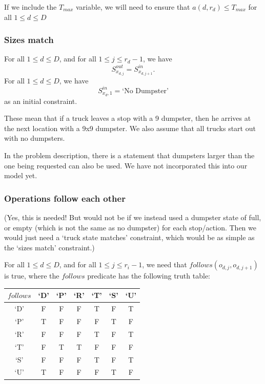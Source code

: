 \documentclass{article}
\begin{document}
If we include the $T_{max}$ variable, we will need to ensure that $a(d,r_d) \le T_{max}$ for all $1 \le d \le D$

\subsubsection {Sizes match}

For all $1 \le d \le D$, and for all $1 \le j \le r_d - 1$, we have
$$S^{out}_{x_{d,j}} = S^{in}_{x_{d,j+1}}.$$
For all $1 \le d \le D$, we have
$$S^{in}_{x_d,1} = \mbox{`No Dumpster'} $$
as an initial constraint.

These mean that if a truck leaves a stop with a 9 dumpster, then he arrives at the next location with a 9x9 dumpster.
We also assume that all trucks start out with no dumpsters.

In the problem description, there is a statement that dumpsters larger than the one being requested can also be used.
We have not incorporated this into our model yet.

\subsubsection {Operations follow each other}
(Yes, this is needed! But would not be if we instead used a dumpster state of full, or empty (which is not the same as no dumpster) for each stop/action.
Then we would just need a `truck state matches' constraint, which would be as simple as the `sizes match' constraint.)

For all $1 \le d \le D$, and for all $1 \le j \le r_i - 1$, we need that $follows(o_{d, j}, o_{d, j+1})$ is true, where the $follows$ predicate has the following truth table:

\begin{tabular}{ c | c c c c c c }
 $follows$    & `D' & `P' & `R' & `T' & `S' & `U' \\
 \hline
 `D'          & F   & F   & F   & T   & F   & T   \\
 `P'          & T   & F   & F   & F   & T   & F   \\
 `R'          & F   & F   & F   & T   & F   & T   \\
 `T'          & F   & T   & T   & F   & F   & F   \\
 `S'          & F   & F   & F   & T   & F   & T   \\
 `U'          & T   & F   & F   & F   & T   & F   \\
\end{tabular}
\end{document}
